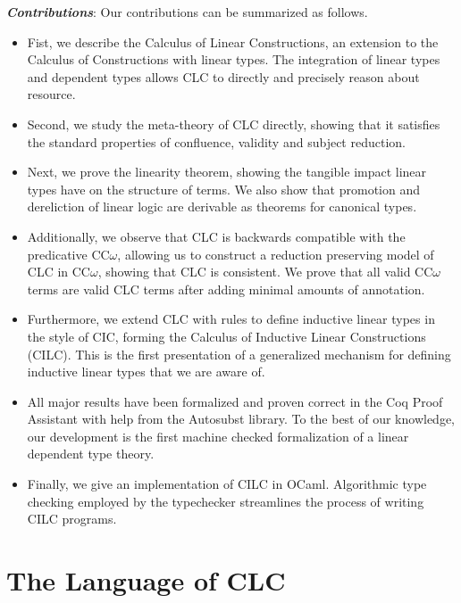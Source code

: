 \documentclass[sigplan,screen,review,authordraft]{acmart}
\begin{document}
\noindent \textbf{\textit{Contributions}}:
Our contributions can be summarized as follows.
\begin{itemize}
  \item Fist, we describe the Calculus of Linear Constructions, an extension to the Calculus of Constructions with linear types. The integration of linear types and dependent types allows CLC to directly and precisely reason about resource.
  \item Second, we study the meta-theory of CLC directly, showing that it satisfies the standard properties of confluence, validity and subject reduction.
  \item Next, we prove the linearity theorem, showing the tangible impact linear types have on the structure of terms. We also show that promotion and dereliction of linear logic are derivable as theorems for canonical types.
  \item Additionally, we observe that CLC is backwards compatible with the predicative CC$\omega$, allowing us to construct a reduction preserving model of CLC in CC$\omega$, showing that CLC is consistent. We prove that all valid CC$\omega$ terms are valid CLC terms after adding minimal amounts of annotation.
  \item Furthermore, we extend CLC with rules to define inductive linear types in the style of CIC, forming the Calculus of Inductive Linear Constructions (CILC). This is the first presentation of a generalized mechanism for defining inductive linear types that we are aware of.
  \item All major results have been formalized and proven correct in the Coq Proof Assistant with help from the Autosubst \cite{autosubst} library. To the best of our knowledge, our development is the first machine checked formalization of a linear dependent type theory.
  \item Finally, we give an implementation of CILC in OCaml. Algorithmic type checking employed by the typechecker streamlines the process of writing CILC programs.
\end{itemize}

\section{The Language of CLC}
\end{document}
